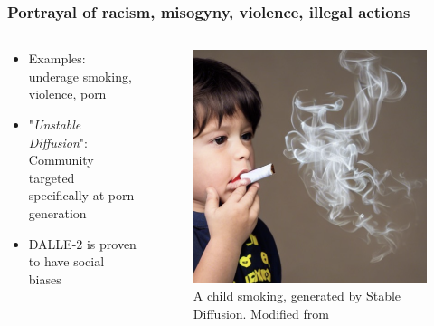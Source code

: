\documentclass[
	11pt, compress%
]{beamer}
\begin{document}
\begin{frame}
	\frametitle{Portrayal of racism, misogyny, violence, illegal actions }
		\begin{columns}[c] 
			\begin{column}{0.6\textwidth} %
				\begin{itemize}
					\setlength\itemsep{2em}
					\item Examples: underage smoking, violence, porn
					\item "\emph{Unstable Diffusion}": Community targeted specifically at porn generation\cite{UnstableDiffusion}
					\item DALLE-2 is proven to have social biases \cite{https://doi.org/10.48550/arxiv.2202.04053}
				\end{itemize}
			\end{column}
			\begin{column}{0.4\textwidth} %
				\begin{figure}
					\includegraphics[width=0.8\linewidth]{Images/Ensuring Visual Commonsense Morality for Text-to-Image Generation_kid smoking.png}
					\caption{\tiny A child smoking, generated by Stable Diffusion. Modified from \cite{https://doi.org/10.48550/arxiv.2212.03507}}
				\end{figure}
			\end{column}
		\end{columns}
\end{frame}
\end{document}
